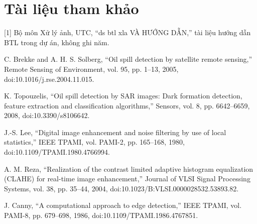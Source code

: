 \documentclass[13pt,a4paper]{extreport}
\begin{document}
\section*{Tài liệu tham khảo}
[1] Bộ môn Xử lý ảnh, UTC, “ds btl xla VÀ HƯỚNG DẪN,” tài liệu hướng dẫn BTL trong dự án, không ghi năm.
\par
[2] C. Brekke and A. H. S. Solberg, “Oil spill detection by satellite remote sensing,” Remote Sensing of Environment, vol. 95, pp. 1–13, 2005, doi:10.1016/j.rse.2004.11.015.
\par
[3] K. Topouzelis, “Oil spill detection by SAR images: Dark formation detection, feature extraction and classification algorithms,” Sensors, vol. 8, pp. 6642–6659, 2008, doi:10.3390/s8106642.
\par
[4] J.-S. Lee, “Digital image enhancement and noise filtering by use of local statistics,” IEEE TPAMI, vol. PAMI-2, pp. 165–168, 1980, doi:10.1109/TPAMI.1980.4766994.
\par
[5] A. M. Reza, “Realization of the contrast limited adaptive histogram equalization (CLAHE) for real-time image enhancement,” Journal of VLSI Signal Processing Systems, vol. 38, pp. 35–44, 2004, doi:10.1023/B:VLSI.0000028532.53893.82.
\par
[6] J. Canny, “A computational approach to edge detection,” IEEE TPAMI, vol. PAMI-8, pp. 679–698, 1986, doi:10.1109/TPAMI.1986.4767851.
\par
\clearpage
\end{document}
